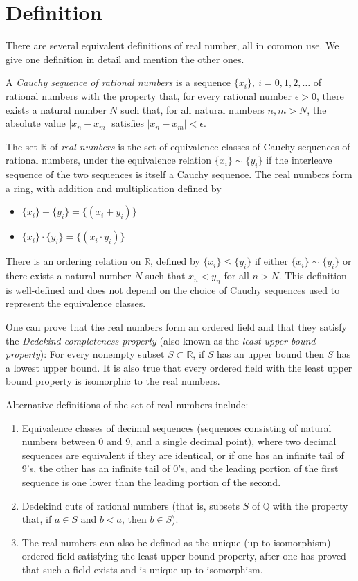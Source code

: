 \documentclass{article}
\begin{document}
\section{Definition}
There are several equivalent definitions of real number, all in common use. We give one definition in detail and mention the other ones.

A {\em Cauchy sequence of rational numbers} is a sequence $\{x_i\},\ i=0,1,2,\dots$ of rational numbers with the property that, for every rational number $\epsilon > 0$, there exists a natural number $N$ such that, for all natural numbers $n,m > N$, the absolute value $|x_n - x_m|$ satisfies $|x_n - x_m| < \epsilon$.

The set $\mathbb{R}$ of {\em real numbers} is the set of equivalence classes of Cauchy sequences of rational numbers, under the equivalence relation $\{x_i\} \sim \{y_i\}$ if the interleave sequence of the two sequences is itself a Cauchy sequence.
The real numbers form a ring, with addition and multiplication defined by
\begin{itemize}
\item $\{x_i\} + \{y_i\} = \{(x_i+y_i)\}$
\item $\{x_i\} \cdot \{y_i\} = \{(x_i \cdot y_i)\}$
\end{itemize}
There is an ordering relation on $\mathbb{R}$, defined by $\{x_i\} \leq \{y_i\}$ if either $\{x_i\} \sim \{y_i\}$ or there exists a natural number $N$ such that $x_n < y_n$ for all $n > N$. This definition is well-defined and does not depend on the choice of Cauchy sequences used to represent the equivalence classes.

One can prove that the real numbers form an ordered field and that they satisfy the \emph{Dedekind completeness property} (also known as the \emph{least upper bound property}): For every nonempty subset $S \subset \mathbb{R}$, if $S$ has an upper bound then $S$ has a lowest upper bound. It is also true that every ordered field with the least upper bound property is isomorphic to the real numbers.

Alternative definitions of the set of real numbers include:
\begin{enumerate}
\item Equivalence classes of decimal sequences (sequences consisting of natural numbers between 0 and 9, and a single decimal point), where two decimal sequences are equivalent if they are identical, or if one has an infinite tail of 9's, the other has an infinite tail of 0's, and the leading portion of the first sequence is one lower than the leading portion of the second.
\item Dedekind cuts of rational numbers (that is, subsets $S$ of $\mathbb{Q}$ with the property that, if $a \in S$ and $b < a$, then $b \in S$).
\item The real numbers can also be defined as the unique (up to isomorphism) ordered field satisfying the least upper bound property, after one has proved that such a field exists and is unique up to isomorphism.
\end{enumerate}
\end{document}
